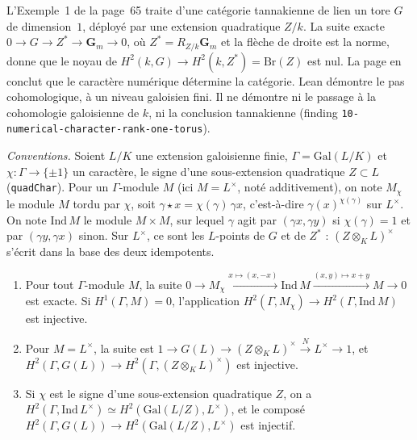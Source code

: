 L'Exemple~1 de la page~65 traite d'une catégorie tannakienne de lien un tore $G$ de dimension~$1$, déployé par une extension quadratique $Z/k$. La suite exacte $0 \to G \to Z^* \to \mathbf G_m \to 0$, où $Z^* = R_{Z/k}\mathbf G_m$ et la flèche de droite est la norme, donne  que le noyau de $H^2(k, G) \to H^2(k, Z^*) = \mathrm{Br}(Z)$ est nul. La page en conclut que le caractère numérique détermine la catégorie. Lean démontre le pas cohomologique, à un niveau galoisien fini. Il ne démontre ni le passage à la cohomologie galoisienne de $k$, ni la conclusion tannakienne (finding \texttt{10-numerical-character-rank-one-torus}).

\noindent\emph{Conventions.} Soient $L/K$ une extension galoisienne finie, $\Gamma = \mathrm{Gal}(L/K)$ et $\chi \colon \Gamma \to \{\pm 1\}$ un caractère, le signe d'une sous-extension quadratique $Z \subset L$ (\texttt{quadChar}). Pour un $\Gamma$-module $M$ (ici $M = L^\times$, noté additivement), on note $M_\chi$ le module $M$ tordu par $\chi$, soit $\gamma \star x = \chi(\gamma)\,\gamma x$, c'est-à-dire $\gamma(x)^{\chi(\gamma)}$ sur $L^\times$. On note $\mathrm{Ind}\,M$ le module $M \times M$, sur lequel $\gamma$ agit par $(\gamma x, \gamma y)$ si $\chi(\gamma) = 1$ et par $(\gamma y, \gamma x)$ sinon. Sur $L^\times$, ce sont les $L$-points de $G$ et de $Z^*$ : $(Z \otimes_K L)^\times$ s'écrit dans la base des deux idempotents.

\begin{encadre}
\begin{enonce}\leavevmode
\begin{enumerate}
\item[(a)] Pour tout $\Gamma$-module $M$, la suite $0 \to M_\chi \xrightarrow{x \mapsto (x, -x)} \mathrm{Ind}\,M \xrightarrow{(x,y) \mapsto x + y} M \to 0$ est exacte. Si $H^1(\Gamma, M) = 0$, l'application $H^2(\Gamma, M_\chi) \to H^2(\Gamma, \mathrm{Ind}\,M)$ est injective.
\item[(b)] Pour $M = L^\times$, la suite est $1 \to G(L) \to (Z \otimes_K L)^\times \xrightarrow{N} L^\times \to 1$, et $H^2(\Gamma, G(L)) \to H^2(\Gamma, (Z \otimes_K L)^\times)$ est injective.
\item[(c)] Si $\chi$ est le signe d'une sous-extension quadratique $Z$, on a $H^2(\Gamma, \mathrm{Ind}\,L^\times) \simeq H^2(\mathrm{Gal}(L/Z), L^\times)$, et le composé $H^2(\Gamma, G(L)) \to H^2(\mathrm{Gal}(L/Z), L^\times)$ est injectif.
\end{enumerate}
\end{enonce}
\end{encadre}


